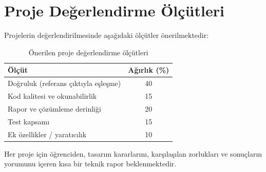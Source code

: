\section{Proje Değerlendirme Ölçütleri}
\label{sec:ekd-degerlendirme}

Projelerin değerlendirilmesinde aşağıdaki ölçütler önerilmektedir:

\begin{table}[H]
\centering
\caption[Proje değerlendirme ölçütleri]{Önerilen proje değerlendirme ölçütleri}
\label{tab:ekd-degerlendirme}
\begin{tabular}{@{}lc@{}}
\toprule
\textbf{Ölçüt} & \textbf{Ağırlık (\%)} \\
\midrule
Doğruluk (referans çıktıyla eşleşme)   & 40 \\
Kod kalitesi ve okunabilirlik            & 15 \\
Rapor ve çözümleme derinliği                & 20 \\
Test kapsamı                             & 15 \\
Ek özellikler / yaratıcılık             & 10 \\
\bottomrule
\end{tabular}
\end{table}

Her proje için öğrenciden, tasarım kararlarını, karşılaşılan zorlukları ve sonuçların yorumunu içeren kısa bir teknik rapor beklenmektedir.
